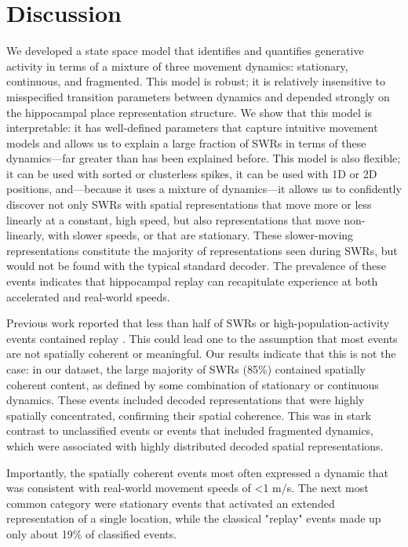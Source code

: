 \documentclass[times, twoside]{zHenriquesLab-StyleBioRxiv}
\begin{document}
\section*{Discussion}
We developed a state space model that identifies and quantifies generative activity in terms of a mixture of three movement dynamics: stationary, continuous, and fragmented. This model is robust; it is relatively insensitive to misspecified transition parameters between dynamics and depended strongly on the hippocampal place representation structure. We show that this model is interpretable: it has well-defined parameters that capture intuitive movement models and allows us to explain a large fraction of SWRs in terms of these dynamics---far greater than has been explained before. This model is also flexible; it can be used with sorted or clusterless spikes, it can be used with 1D or 2D positions, and---because it uses a mixture of dynamics---it allows us to confidently discover not only SWRs with spatial representations that move more or less linearly at a constant, high speed, but also representations that move non-linearly,  with slower speeds, or that are stationary. These slower-moving representations constitute the majority of representations seen during SWRs, but would not be found with the typical standard decoder. The prevalence of these events indicates that hippocampal replay can recapitulate experience at both accelerated and real-world speeds.

Previous work reported that less than half of SWRs or high-population-activity events contained replay \cite{KarlssonAwakereplayremote2009, FosterReversereplaybehavioural2006, DavidsonHippocampalReplayExtended2009}. This could lead one to the assumption that most events are not spatially coherent or meaningful. Our results indicate that this is not the case: in our dataset, the large majority of SWRs (85\%) contained spatially coherent content, as defined by some combination of stationary or continuous dynamics. These events included decoded representations that were highly spatially concentrated, confirming their spatial coherence. This was in stark contrast to unclassified events or events that included fragmented dynamics, which were associated with highly distributed decoded spatial representations. 

Importantly, the spatially coherent events most often expressed a dynamic that was consistent with real-world movement speeds of <1 m/s. The next most common category were stationary events \cite{JaiDistincthippocampalcorticalmemory2017, FarooqEmergencepreconfiguredplastic2019} that activated an extended representation of a single location, while the classical "replay" events made up only about 19\% of classified events. 
\end{document}
